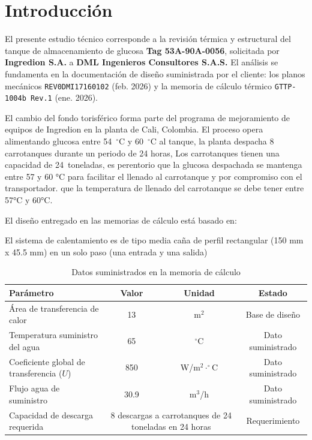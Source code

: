 \documentclass[12pt,a4paper]{elsarticle}
\begin{document}




\section{Introducción}

El presente estudio técnico corresponde a la revisión térmica y estructural del tanque de almacenamiento de glucosa \textbf{Tag 53A-90A-0056}, solicitada por \textbf{Ingredion S.A.} a \textbf{DML Ingenieros Consultores S.A.S.} El análisis se fundamenta en la documentación de diseño suministrada por el cliente: los planos mecánicos \texttt{REV0DMI17160102} (feb. 2026) y la memoria de cálculo térmico \texttt{GTTP-1004b Rev.1} (ene. 2026).

El cambio del fondo torisférico forma parte del programa de mejoramiento de equipos de Ingredion en la planta de Cali, Colombia. El proceso opera alimentando glucosa entre 54~$^\circ$C y 60~$^\circ$C al tanque, la planta despacha 8 carrotanques durante un periodo de 24 horas, Los carrotanques tienen una capacidad de 24~toneladas, es perentorio que la glucosa despachada se mantenga entre 57 y 60 °C para facilitar el llenado al carrotanque y por compromiso con el transportador.  que la temperatura de  llenado del carrotanque se debe tener entre 57°C y 60°C.

El diseño entregado en las memorias de cálculo está basado en:

  El sistema de calentamiento es de tipo  media caña de perfil rectangular (150 mm x 45.5 mm) en un solo paso (una entrada y una salida)

\begin{table}[H]
\centering
\footnotesize
\caption{Datos suministrados en la memoria de cálculo}
\label{tab:kpi}
\begin{tabularx}{\textwidth}{@{}Xccc@{}}
\toprule
\textbf{Parámetro} & \textbf{Valor} & \textbf{Unidad} & \textbf{Estado} \\
\midrule
Área de transferencia de calor & 13 & m$^2$ & Base de diseño \\
Temperatura suministro del agua & 65 & $^\circ$C & Dato suministrado \\
Coeficiente global de transferencia ($U$) & 850 & W/m$^2\cdot^\circ$C & Dato suministrado \\
Flujo agua de suministro & 30.9 & m$^3$/h & Dato suministrado \\
Capacidad de descarga requerida & \multicolumn{2}{c}{8 descargas a carrotanques de 24 toneladas en 24 horas} & Requerimiento \\
\bottomrule
\end{tabularx}
\end{table}
\end{document}

